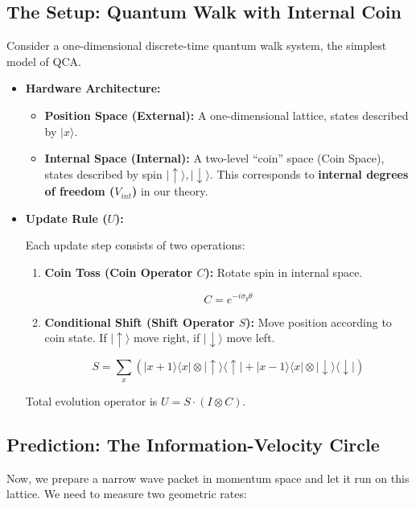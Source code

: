 \documentclass[11pt,a4paper,twoside]{book}
\begin{document}
\subsection{The Setup: Quantum Walk with Internal Coin}

Consider a one-dimensional discrete-time quantum walk system, the simplest model of QCA.

\begin{itemize}
\item \textbf{Hardware Architecture:}

  \begin{itemize}
  \item \textbf{Position Space (External):} A one-dimensional lattice, states described by $|x\rangle$.

  \item \textbf{Internal Space (Internal):} A two-level ``coin'' space (Coin Space), states described by spin $| \uparrow \rangle, | \downarrow \rangle$. This corresponds to \textbf{internal degrees of freedom ($V_{int}$)} in our theory.
  \end{itemize}

\item \textbf{Update Rule ($U$):}

  Each update step consists of two operations:

  \begin{enumerate}
  \item \textbf{Coin Toss (Coin Operator $C$):} Rotate spin in internal space.

     $$C = e^{-i \sigma_y \theta}$$

  \item \textbf{Conditional Shift (Shift Operator $S$):} Move position according to coin state. If $| \uparrow \rangle$ move right, if $| \downarrow \rangle$ move left.

     $$S = \sum_x (|x+1\rangle\langle x| \otimes |\uparrow\rangle\langle\uparrow| + |x-1\rangle\langle x| \otimes |\downarrow\rangle\langle\downarrow|)$$
  \end{enumerate}

  Total evolution operator is $U = S \cdot (I \otimes C)$.
\end{itemize}

\subsection{Prediction: The Information-Velocity Circle}

Now, we prepare a narrow wave packet in momentum space and let it run on this lattice. We need to measure two geometric rates:
\end{document}
